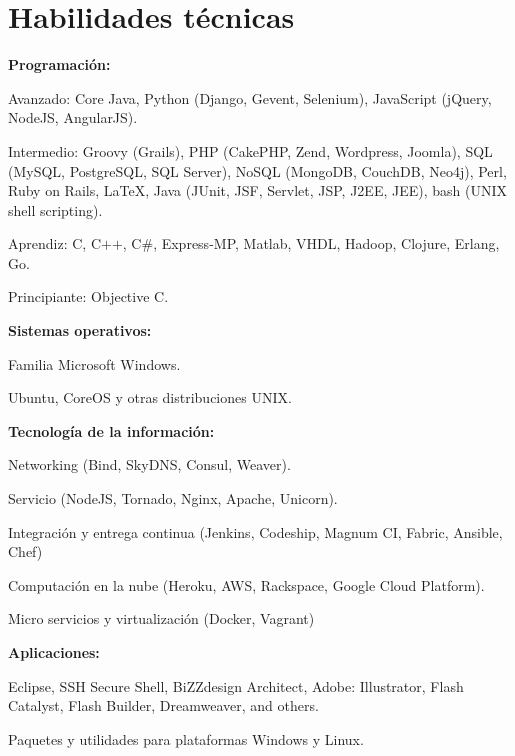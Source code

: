\newpage

\section{Habilidades t\'ecnicas}
%
\textbf{Programaci\'on:}

    \begin{innerlist}
\item Avanzado: Core Java, Python (Django, Gevent, Selenium), JavaScript
(jQuery, NodeJS, AngularJS).
\item Intermedio: Groovy (Grails), PHP
(CakePHP, Zend, Wordpress, Joomla), SQL (MySQL, PostgreSQL, SQL Server), NoSQL (MongoDB,
CouchDB, Neo4j), Perl, Ruby on Rails, \LaTeX{}, 
Java (JUnit, JSF, Servlet, JSP, J2EE, JEE), bash (UNIX shell scripting).
\item Aprendiz: C, C$+$$+$, C\#, Express-MP, Matlab, VHDL, Hadoop, Clojure,
Erlang, Go.
\item Principiante: Objective C.
    \end{innerlist}

\halfblankline

\textbf{Sistemas operativos:}
    \begin{innerlist}
\item Familia Microsoft Windows.
\item Ubuntu, CoreOS y otras distribuciones UNIX.
    \end{innerlist}
    
\halfblankline

\textbf{Tecnolog\'ia de la informaci\'on:} 
    \begin{innerlist}
\item Networking (Bind, SkyDNS, Consul, Weaver).
\item Servicio (NodeJS, Tornado, Nginx, Apache, Unicorn).
\item Integraci\'on y entrega continua (Jenkins, Codeship, Magnum CI, Fabric,
Ansible, Chef)
\item Computaci\'on en la nube (Heroku, AWS, Rackspace, Google Cloud Platform).
\item Micro servicios y virtualización (Docker, Vagrant)
    \end{innerlist}

\halfblankline

\textbf{Aplicaciones:} 
    \begin{innerlist}
\item Eclipse, SSH Secure Shell, BiZZdesign
Architect, Adobe: Illustrator, Flash Catalyst, Flash Builder, Dreamweaver, and
others.
\item Paquetes y utilidades para plataformas Windows y Linux.
    \end{innerlist}


